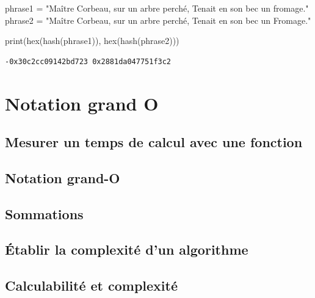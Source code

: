 \documentclass[
  letterpaper,
]{scrbook}
\newenvironment{Shaded}{}{}
\newcommand{\BuiltInTok}[1]{#1}
\newcommand{\NormalTok}[1]{#1}
\newcommand{\OperatorTok}[1]{\textcolor[rgb]{0.40,0.40,0.40}{#1}}
\newcommand{\StringTok}[1]{\textcolor[rgb]{0.25,0.44,0.63}{#1}}
\theoremstyle{plain}
\theoremstyle{definition}
\theoremstyle{definition}
\theoremstyle{remark}
\begin{document}
\hypertarget{fonction-hachage-renard-corbeau}{}
\begin{Shaded}
\begin{Highlighting}[]
\NormalTok{phrase1 }\OperatorTok{=} \StringTok{"Maître Corbeau, sur un arbre perché, Tenait en son bec un fromage."}
\NormalTok{phrase2 }\OperatorTok{=} \StringTok{"Maître Corbeau, sur un arbre perché, Tenait en son bec un Fromage."}

\BuiltInTok{print}\NormalTok{(}\BuiltInTok{hex}\NormalTok{(}\BuiltInTok{hash}\NormalTok{(phrase1)), }\BuiltInTok{hex}\NormalTok{(}\BuiltInTok{hash}\NormalTok{(phrase2)))}
\end{Highlighting}
\end{Shaded}

\begin{verbatim}
-0x30c2cc09142bd723 0x2881da047751f3c2
\end{verbatim}


\hypertarget{notation-grand-o}{%
\chapter{Notation grand O}\label{notation-grand-o}}

\hypertarget{mesurer-un-temps-de-calcul-avec-une-fonction}{%
\section{Mesurer un temps de calcul avec une
fonction}\label{mesurer-un-temps-de-calcul-avec-une-fonction}}

\hypertarget{notation-grand-o-1}{%
\section{Notation grand-O}\label{notation-grand-o-1}}

\hypertarget{sommations}{%
\section{Sommations}\label{sommations}}

\hypertarget{uxe9tablir-la-complexituxe9-dun-algorithme}{%
\section{Établir la complexité d'un
algorithme}\label{uxe9tablir-la-complexituxe9-dun-algorithme}}

\hypertarget{calculabilituxe9-et-complexituxe9}{%
\section{Calculabilité et
complexité}\label{calculabilituxe9-et-complexituxe9}}
\end{document}
